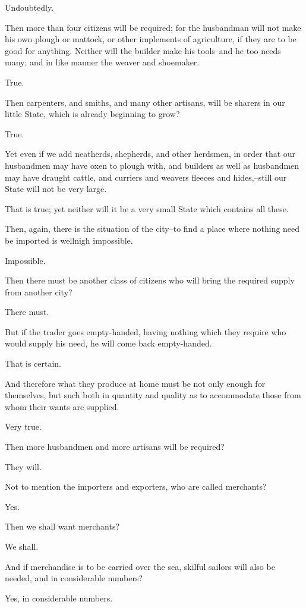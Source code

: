 Undoubtedly.

Then more than four citizens will be required; for the husbandman will
not make his own plough or mattock, or other implements of agriculture,
if they are to be good for anything. Neither will the builder make
his tools--and he too needs many; and in like manner the weaver and
shoemaker.

True.

Then carpenters, and smiths, and many other artisans, will be sharers in
our little State, which is already beginning to grow?

True.

Yet even if we add neatherds, shepherds, and other herdsmen, in order
that our husbandmen may have oxen to plough with, and builders as well
as husbandmen may have draught cattle, and curriers and weavers fleeces
and hides,--still our State will not be very large.

That is true; yet neither will it be a very small State which contains
all these.

Then, again, there is the situation of the city--to find a place where
nothing need be imported is wellnigh impossible.

Impossible.

Then there must be another class of citizens who will bring the required
supply from another city?

There must.

But if the trader goes empty-handed, having nothing which they require
who would supply his need, he will come back empty-handed.

That is certain.

And therefore what they produce at home must be not only enough for
themselves, but such both in quantity and quality as to accommodate
those from whom their wants are supplied.

Very true.

Then more husbandmen and more artisans will be required?

They will.

Not to mention the importers and exporters, who are called merchants?

Yes.

Then we shall want merchants?

We shall.

And if merchandise is to be carried over the sea, skilful sailors will
also be needed, and in considerable numbers?

Yes, in considerable numbers.

